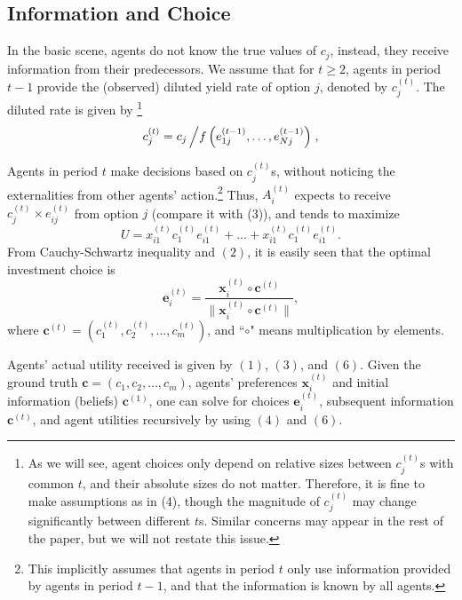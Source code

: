 \documentclass[12pt,english]{article}
\theoremstyle{plain}
\theoremstyle{plain}
\begin{document}
	\subsection{Information and Choice}
	In the basic scene, agents do not know the true values of $c_j$, instead, they receive information from their predecessors. We assume that for $t \geqslant 2$, agents in period $t - 1$ provide the (observed) diluted yield rate of option $j$, denoted by $c_j^{(t)}$. The diluted rate is given by
	\footnote{As we will see, agent choices only depend on relative sizes between $c_j^{(t)}$s with common $t$, and their absolute sizes do not matter. Therefore, it is fine to make assumptions as in (4), though the magnitude of $c_j^{(t)}$ may change significantly between different $t$s. Similar concerns may appear in the rest of the paper, but we will not restate this issue.}
	\begin{equation}
		c^{(t)}_j = c_j\left/f\left(e_{1j}^{(t - 1)}, \dots,e_{Nj}^{(t - 1)}\right)\right.,
	\end{equation}\par 
	Agents in period $t$ make decisions based on $c_j^{(t)}$s, without noticing the externalities from other agents' action.\footnote{This implicitly assumes that agents in period $t$ only use information provided by agents in period $t - 1$, and that the information is known by all agents.} Thus, $A_i^{(t)}$ expects to receive $c_j^{(t)}\times e_{ij}^{(t)}$ from option $j$ (compare it with (3)), and tends to maximize
	\begin{equation}
	U = x_{i1}^{(t)}c_{1}^{(t)}e_{i1}^{(t)} + \dots + x_{i1}^{(t)}c_{1}^{(t)}e_{i1}^{(t)}.
	\end{equation} 
	From Cauchy-Schwartz inequality and $(2)$, it is easily seen that the optimal investment choice is 
	\begin{equation}
		\mathbf{e}_{i}^{(t)} = \frac{\mathbf{x}_i^{(t)}\circ \mathbf{c}^{(t)}}{\lVert\mathbf{x}_i^{(t)}\circ \mathbf{c}^{(t)}\rVert},
	\end{equation}
	where $\mathbf{c}^{(t)} = \left(c_1^{(t)}, c_2^{(t)}, \dots, c_m^{(t)}\right)$, and ``$\circ$" means multiplication by elements. \par
	Agents' actual utility received is given by $(1)$, $(3)$, and $(6)$.
	Given the ground truth $\mathbf{c} = \left(c_1, c_2, \dots, c_m\right)$, agents' preferences $\mathbf{x}_i^{(t)}$ and initial information (beliefs) $\mathbf{c}^{(1)}$, one can solve for choices $\mathbf{e}_i^{(t)}$, subsequent information $\mathbf{c}^{(t)}$, and agent utilities recursively by using $(4)$ and $(6)$.
	
\end{document}
